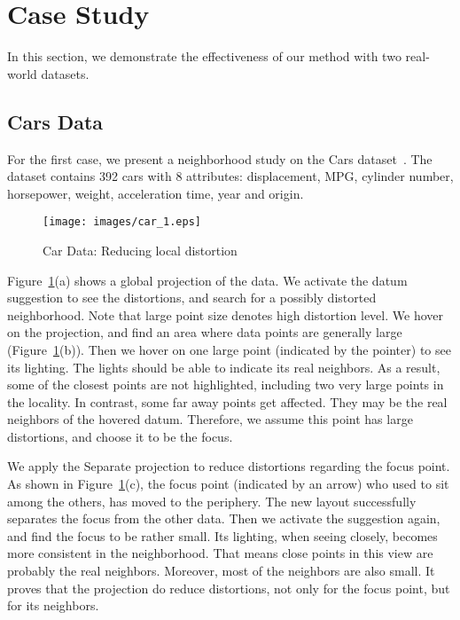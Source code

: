 \section{Case Study}
In this section, we demonstrate the effectiveness of our method with two real-world datasets.

\subsection{Cars Data}
For the first case, we present a neighborhood study on the Cars dataset~\cite{Lichman:2013}. The dataset contains 392 cars with 8 attributes: displacement, MPG, cylinder number, horsepower, weight, acceleration time, year and origin.

\begin{figure}[htbp]
\centering
  \texttt{[image: images/car\_1.eps]}%
  \caption{Car Data: Reducing local distortion}
\label{fig:car}
  \end{figure}

Figure~\ref{fig:car}(a) shows a global projection of the data. We activate the datum suggestion to see the distortions, and search for a possibly distorted neighborhood. Note that large point size denotes high distortion level. We hover on the projection, and find an area where data points are generally large (Figure~\ref{fig:car}(b)). Then we hover on one large point (indicated by the pointer) to see its lighting. The lights should be able to indicate its real neighbors. As a result, some of the closest points are not highlighted, including two very large points in the locality. In contrast, some far away points get affected. They may be the real neighbors of the hovered datum. Therefore, we assume this point has large distortions, and choose it to be the focus.

We apply the Separate projection to reduce distortions regarding the focus point. As shown in Figure~\ref{fig:car}(c), the focus point (indicated by an arrow) who used to sit among the others, has moved to the periphery. The new layout successfully separates the focus from the other data. Then we activate the suggestion again, and find the focus to be rather small. Its lighting, when seeing closely, becomes more consistent in the neighborhood. That means close points in this view are probably the real neighbors. Moreover, most of the neighbors are also small. It proves that the projection do reduce distortions, not only for the focus point, but for its neighbors.

